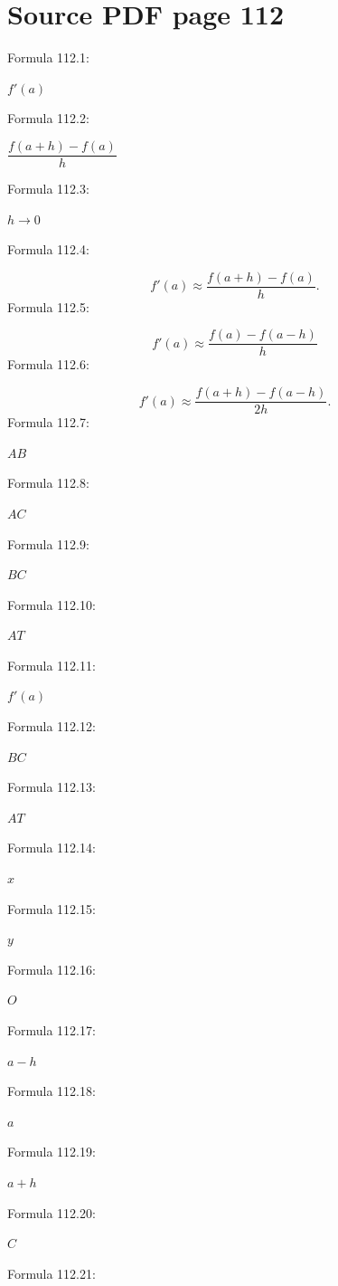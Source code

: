 \documentclass[11pt]{article}
\begin{document}
\section*{Source PDF page 112}
\noindent Formula 112.1:\par
$f'(a)$\par
\noindent Formula 112.2:\par
$\dfrac{f(a+h)-f(a)}h$\par
\noindent Formula 112.3:\par
$h\to0$\par
\noindent Formula 112.4:\par
\[
f'(a)\approx\frac{f(a+h)-f(a)}h.
\]
\noindent Formula 112.5:\par
\[
f'(a)\approx\frac{f(a)-f(a-h)}h
\]
\noindent Formula 112.6:\par
\[
f'(a)\approx\frac{f(a+h)-f(a-h)}{2h}.
\]
\noindent Formula 112.7:\par
$AB$\par
\noindent Formula 112.8:\par
$AC$\par
\noindent Formula 112.9:\par
$BC$\par
\noindent Formula 112.10:\par
$AT$\par
\noindent Formula 112.11:\par
$f'(a)$\par
\noindent Formula 112.12:\par
$BC$\par
\noindent Formula 112.13:\par
$AT$\par
\noindent Formula 112.14:\par
$x$\par
\noindent Formula 112.15:\par
$y$\par
\noindent Formula 112.16:\par
$O$\par
\noindent Formula 112.17:\par
$a-h$\par
\noindent Formula 112.18:\par
$a$\par
\noindent Formula 112.19:\par
$a+h$\par
\noindent Formula 112.20:\par
$C$\par
\noindent Formula 112.21:\par
\end{document}
